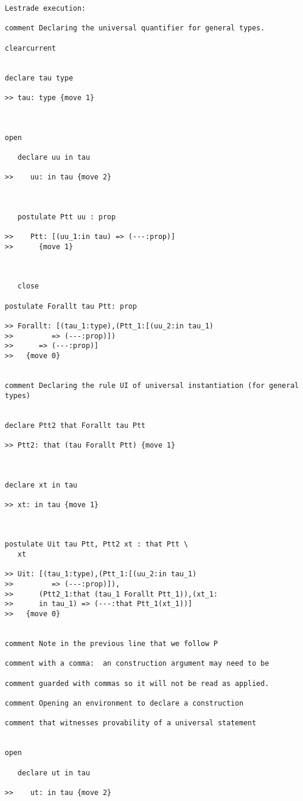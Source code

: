 \documentclass[12pt]{article}
\begin{document}
\begin{verbatim}Lestrade execution:

comment Declaring the universal quantifier for general types.

clearcurrent


declare tau type

>> tau: type {move 1}



open

   declare uu in tau

>>    uu: in tau {move 2}



   postulate Ptt uu : prop

>>    Ptt: [(uu_1:in tau) => (---:prop)]
>>      {move 1}



   close

postulate Forallt tau Ptt: prop

>> Forallt: [(tau_1:type),(Ptt_1:[(uu_2:in tau_1)
>>         => (---:prop)])
>>      => (---:prop)]
>>   {move 0}


comment Declaring the rule UI of universal instantiation (for general types)


declare Ptt2 that Forallt tau Ptt

>> Ptt2: that (tau Forallt Ptt) {move 1}



declare xt in tau

>> xt: in tau {move 1}



postulate Uit tau Ptt, Ptt2 xt : that Ptt \
   xt

>> Uit: [(tau_1:type),(Ptt_1:[(uu_2:in tau_1)
>>         => (---:prop)]),
>>      (Ptt2_1:that (tau_1 Forallt Ptt_1)),(xt_1:
>>      in tau_1) => (---:that Ptt_1(xt_1))]
>>   {move 0}


comment Note in the previous line that we follow P 

comment with a comma:  an construction argument may need to be 

comment guarded with commas so it will not be read as applied.

comment Opening an environment to declare a construction 

comment that witnesses provability of a universal statement


open

   declare ut in tau

>>    ut: in tau {move 2}




\end{verbatim}
\end{document}
